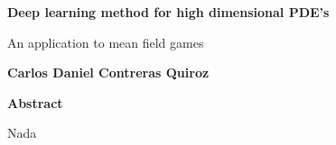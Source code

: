 

\fancyhf{} %
\fancyhead[RO,R]{\thepage} %
\renewcommand{\headrulewidth}{0pt}

\begin{center}
    \Large
    \textbf{Deep learning method for high dimensional PDE's}
    
    \vspace{0.4cm}
    \large
    An application to mean field games
    
    \vspace{0.4cm}
    \textbf{Carlos Daniel Contreras Quiroz}
    
    \vspace{0.9cm}
    \textbf{Abstract}
\end{center}
Nada